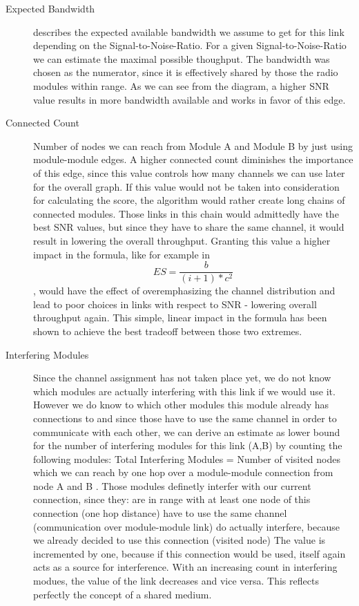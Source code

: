   \begin{description}
    \item[Expected Bandwidth]
    describes the expected available bandwidth we assume to get for this link depending on the Signal-to-Noise-Ratio.
    For a given Signal-to-Noise-Ratio we can estimate the maximal possible thoughput.
    The bandwidth was chosen as the numerator, since it is effectively shared by those the radio modules within range.
    As we can see from the diagram, a higher SNR value results in more bandwidth available and works in favor of this edge.
    \item[Connected Count]
    Number of nodes we can reach from Module A and Module B by just using module-module edges. 
    A higher connected count diminishes the importance of this edge, since this value controls how many channels we can use later for the overall graph.
    If this value would not be taken into consideration for calculating the score, the algorithm would rather create long chains of connected modules. 
    Those links in this chain would admittedly have the best SNR values, but since they have to share the same channel, it would result in lowering the overall throughput.
    Granting this value a higher impact in the formula, like for example in 
    \begin{equation}
      ES=\frac{b}{(i + 1)* c^2}
    \end{equation}
    , would have the effect of overemphasizing 
    the channel distribution and lead to poor choices in links with respect to SNR - lowering overall throughput again.
    This simple, linear impact in the formula has been shown to achieve the best tradeoff between those two extremes.
    \item[Interfering Modules]
    Since the channel assignment has not taken place yet, we do not know which modules are actually interfering with this link if we would use it.
    However we do know to which other modules this module already has connections to and since those have to use the same channel in order to communicate with each
    other, we can derive an estimate as lower bound for the number of interfering modules for this link (A,B) by counting the following modules:
    Total Interfering Modules = Number of visited nodes which we can reach by one hop over a module-module connection from node A and B
    . Those modules definetly interfer with our current connection, since they:
      are in range with at least one node of this connection (one hop distance)
      have to use the same channel (communication over module-module link)
      do actually interfere, because we already decided to use this connection (visited node)
    The value is incremented by one, because if this connection would be used, itself again acts as a source for interference.
    With an increasing count in interfering modues, the value of the link decreases and vice versa. This reflects perfectly the concept of a shared medium.
  \end{description}

